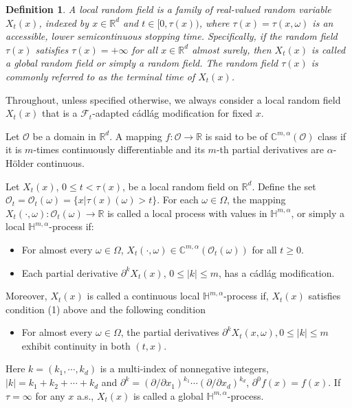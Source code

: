 \documentclass[10pt,a4paper]{amsart}
\newtheorem{definition}[theorem]{Definition}
\def\mC{{\mathbb C}}
\def\mH{{\mathbb H}}
\def\mR{{\mathbb R}}
\def\sF{{\mathscr F}}
\def\sO{{\mathscr O}}
\def\geq{\geqslant}
\def\leq{\leqslant}
\numberwithin{equation}{section}
\begin{document}
\begin{definition}
	A local random field is a family of real-valued random variable $X_t(x)$, indexed by $x\in\mR^d$ and $t\in  [0,\tau(x))$,  where $\tau(x)=\tau(x,\omega)$ is an accessible, lower semicontinuous stopping time. Specifically, if the random field $\tau(x)$ satisfies $\tau(x)=+\infty$ for all $x\in \mR^d$ almost surely, then $X_t(x)$ is called a global random field or simply a random field. The random field $\tau(x)$ is commonly referred  to as the terminal time of $X_t(x)$.
\end{definition}

Throughout, unless specified otherwise, we always consider a local random field  $X_t(x)$ that is a $\sF_t$-adapted  c\'{a}dl\'{a}g modification for fixed $x$.

 Let $\sO$ be a domain in $\mR^d$. A mapping $f:\sO\to \mR$ is said to be of $\mC^{m,\alpha}(\sO)$ class if it is $m$-times continuously differentiable and its $m$-th partial derivatives are $\alpha$-H\"{o}lder continuous. 



Let $X_t(x)$, $0\leq t <\tau(x)$, be a local random field on $\mR^d$. Define the set $\sO_t=\sO_t(\omega)=\{x|\tau(x)(\omega)>t\}$. For each $\omega\in\Omega$, the mapping $X_t(\cdot,\omega): \sO_t(\omega)\to \mR$  is called a local process with values in 
  $\mH^{m,\alpha}$, or simply a  local  $\mH^{m,\alpha}$-process if:
\begin{itemize}
	\item [(1)] For almost every $\omega\in\Omega$, $X_t(\cdot,\omega)\in \mC^{m,\alpha}(\sO_t(\omega))$ for all $t\geq 0$.
	\item [(2)] Each partial derivative  $\partial^kX_t(x)$, $0\leq |k|\leq m$, has a   c\'{a}dl\'{a}g modification. 		
\end{itemize}
Moreover,  $X_t(x)$ is called a continuous local  $\mH^{m,\alpha}$-process if, $X_t(x)$ satisfies condition (1) above and the following condition
\begin{itemize}
	\item [(3)] For almost every $\omega\in\Omega$, the partial derivatives  $\partial^kX_t(x,\omega), 0\leq |k|\leq m$ exhibit continuity in both $(t,x)$.
\end{itemize}

 Here $k=(k_1,\cdots,k_d)$ is a multi-index of nonnegative integers, $|k|=k_1+k_2+\cdots+k_d$ and $\partial^k=(\partial/\partial x_1)^{k_1}\cdots (\partial/\partial x_d)^{k_d}$, $\partial^0 f(x)=f(x)$. If $\tau=\infty$ for any $x$ a.s., $X_t(x)$ is called a global $\mH^{m,\alpha}$-process.
 
\end{document}
